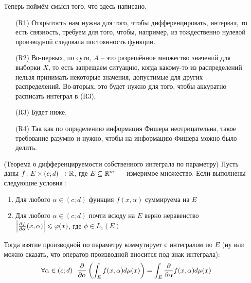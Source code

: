\begin{note}
    Теперь поймём смысл того, что здесь написано.

    \begin{itemize}
        \item[(R1)] Открытость нам нужна для того, чтобы дифференцировать, интервал, то есть связность, требуем для того, чтобы, например, из тождественно нулевой производной следовала постоянность функции.

        \item[(R2)] Во-первых, по сути, $A$ -- это разрешённое множество значений для выборки $X$, то есть запрещаем ситуацию, когда какому-то из распределений нельзя принимать некоторые значения, допустимые для других распределений. Во-вторых, это будет нужно для того, чтобы аккуратно расписать интеграл в (R3).

        \item[(R3)] Будет ниже.

        \item[(R4)] Так как по определению информация Фишера неотрицательна, такое требование разумно и нужно, чтобы на информацию Фишера можно было делить.
    \end{itemize}
\end{note}

\begin{reminder} (Теорема о дифференцируемости собственного интеграла по параметру)
	Пусть даны $f \colon E \times (c; d) \to \mathbb{R}$, где $E \subseteq \mathbb{R}^m$ --- измеримое множество. Если выполнены следующие условия :
	\begin{enumerate}
		\item Для любого $\alpha \in (c; d)$ функция $f(x, \alpha)$ суммируема на $E$
		
		\item Для любого $\alpha \in (c; d)$ почти всюду на $E$ верно неравенство $\left|\frac{\partial f}{\partial \alpha}(x, \alpha)\right| \leqslant \varphi(x)$, где $\phi \in L_1(E)$
	\end{enumerate}
	Тогда взятие производной по параметру коммутирует с интегралом по $E$ (ну или можно сказать, что оператор производной вносится под знак интеграла):
	\[
		\forall \alpha \in (c; d)\ \ \pd{}{\alpha} \ps{\int_E f(x, \alpha)d\mu(x)} = \int_E \pd{}{\alpha}f(x, \alpha)d\mu(x)
	\]
\end{reminder}

